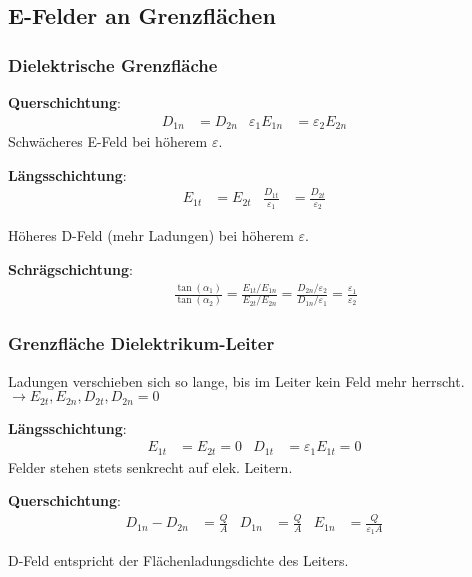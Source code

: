 \subsection{E-Felder an Grenzflächen}
\subsubsection{Dielektrische Grenzfläche}
\textbf{Querschichtung}:
\begin{align*}
	D_{1n} & = D_{2n} & \varepsilon_1 E_{1n} & =\varepsilon_2 E_{2n} &
\end{align*}
Schwächeres E-Feld bei höherem $ \varepsilon $.

\vspace{0.5em}
\textbf{Längsschichtung}:
\begin{align*}
	E_{1t} & = E_{2t} & \frac{D_{1t}}{\varepsilon_1} & = \frac{D_{2t}}{\varepsilon_2} &
\end{align*}

Höheres D-Feld (mehr Ladungen) bei höherem $ \varepsilon $.

\vspace{0.5em}
\textbf{Schrägschichtung}:
\begin{align*}
	 & \frac{\tan( \alpha_1)}{\tan( \alpha_2)} = \frac{E_{1t}/E_{1n}}{E_{2t}/E_{2n}} = \frac{D_{2n}/\varepsilon_2}{D_{1n}/\varepsilon_1} = \frac{ \varepsilon_1}{\varepsilon_2}
\end{align*}

\subsubsection{Grenzfläche Dielektrikum-Leiter}
Ladungen verschieben sich so lange, bis im Leiter kein Feld mehr herrscht.
$\rightarrow E_{2t}, E_{2n}, D_{2t}, D_{2n} = 0 $

\vspace{0.5em}
\textbf{Längsschichtung}:
\begin{align*}
	E_{1t} & = E_{2t} = 0 & D_{1t} & =\varepsilon_1 E_{1t} = 0 &
\end{align*}
Felder stehen stets senkrecht auf elek. Leitern.

\vspace{0.5em}
\textbf{Querschichtung}:
\begin{align*}
	D_{1n} - D_{2n} & = \frac{Q}{A} & D_{1n} & = \frac{Q}{A} & E_{1n} & = \frac{Q}{\varepsilon_1 A} &
\end{align*}

D-Feld entspricht der Flächenladungsdichte des Leiters.

